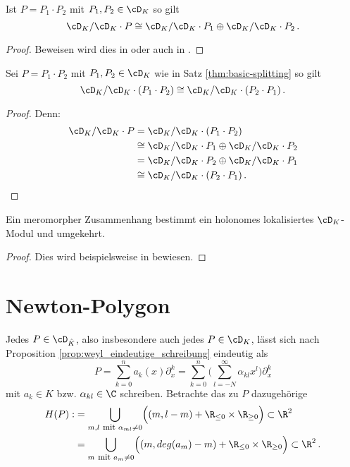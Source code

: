 \begin{thm}\label{thm:basic-splitting}
Ist $P=P_1\cdot P_2$ mit $P_1,P_2\in \cD_K$ so gilt
\[
\cD_K/\cD_K\cdot P \cong \cD_K/\cD_K\cdot P_1 \oplus \cD_K/\cD_K\cdot P_2 \,.
\]
\end{thm}
\begin{proof}
Beweisen wird dies in
\cite[Seite 57-64]{ZulaBarbara}
oder auch in \cite[Seite 30-32]{sabbah_cimpa90}.
\end{proof}
\begin{cor} \label{cor:moduluKomutativität}
Sei $P=P_1\cdot P_2$ mit $P_1,P_2\in \cD_K$ wie in Satz
\ref{thm:basic-splitting} so gilt
\[
\cD_K/\cD_K\cdot (P_1\cdot P_2) \cong \cD_K/\cD_K\cdot (P_2 \cdot P_1) \,.
\]
\end{cor}
\begin{comment}
TODO: verweise auf dieses Korollar
\end{comment}
\begin{proof} Denn:
\begin{align*}
\cD_K/\cD_K\cdot P &= \cD_K/\cD_K\cdot (P_1\cdot P_2)\\
  &\cong \cD_K/\cD_K\cdot P_1 \oplus \cD_K/\cD_K\cdot P_2\\
  &= \cD_K/\cD_K\cdot P_2 \oplus \cD_K/\cD_K\cdot P_1\\
  &\cong \cD_K/\cD_K\cdot (P_2 \cdot P_1) \,.
\end{align*}
\end{proof}

\begin{thm}
Ein meromorpher Zusammenhang bestimmt ein holonomes lokalisiertes
$\cD_K$-Modul und umgekehrt.
\end{thm}
\begin{proof}
Dies wird beispielsweise in \cite[Thm 4.3.2]{sabbah_cimpa90} bewiesen.
\end{proof}

\section{Newton-Polygon} \label{sec:NewtonPolygon}
Jedes $P\in \cD_{\hat K}$, also insbesondere auch jedes $P\in\cD_K$, lässt sich
nach Proposition \ref{prop:weyl_eindeutige_schreibung} eindeutig als
\[
P=\sum^{n}_{k=0}a_k(x)\partial_x^k
=\sum^{n}_{k=0}\big(\sum^{\infty}_{l=-N}{\alpha_{kl}x^l\big)\partial_x^k} 
\]
mit $a_k\in \hat K$ bzw. $\alpha_{kl}\in\C$ schreiben. Betrachte das zu $P$
dazugehörige
\begin{align*}
H(P):&=\underset{m,l\mbox{ \footnotesize mit }\alpha_{ml}\neq0}{\bigcup}
  \Big( (m,l-m) + \R_{\leq 0}\times \R_{\geq 0} \Big) \subset \R^2\\
  &=\underset{m\mbox{ \footnotesize mit }a_{m}\neq0}{\bigcup}
  \Big( (m,deg(a_m)-m) + \R_{\leq 0}\times \R_{\geq 0} \Big) \subset \R^2 \,.
\end{align*}

